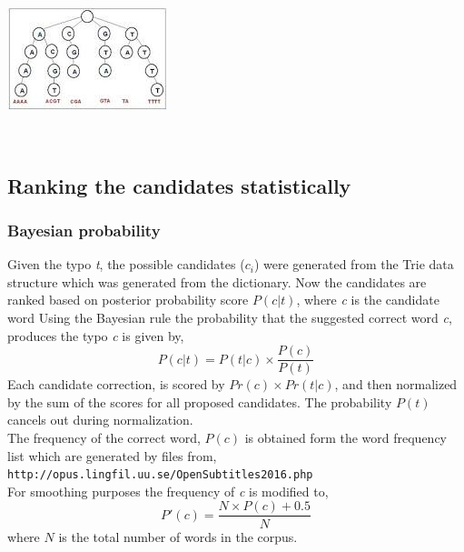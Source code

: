 \documentclass{article}
\begin{document}
				\begin{minipage}{\linewidth}
					\begin{center}
 						\includegraphics[width=\linewidth]{trie}
	  					\label{fig:trie_fig}
					\end{center}
				\end{minipage}\\				
				
		\subsection{Ranking the candidates statistically}
			\subsubsection{Bayesian probability}
				Given the typo \textit{t}, the possible candidates ($c_{i}$) were generated from the Trie data structure which was generated from the dictionary. Now the candidates are ranked based on posterior probability score $P(c|t)$, where \textit{c} is the candidate word
Using the Bayesian rule the probability that the suggested correct word \textit{c}, produces the typo \textit{c} is given by,
				\begin{equation*}
					P(c|t) = P(t|c) \times \frac{P(c)}{P(t)}
				\end{equation*}
				Each candidate correction, is scored by $Pr(c) \times Pr(t|c)$, and then normalized by the sum of the scores for all proposed candidates. The probability $P(t)$ cancels out during normalization.\\
				The frequency of the correct word, $P(c)$ is obtained form the word frequency list which are generated by files from,\\ 
				\texttt{http://opus.lingfil.uu.se/OpenSubtitles2016.php}\\
				For smoothing purposes the frequency of \textit{c} is modified to,
				\begin{equation*}
					P'(c) = \frac{N \times P(c) + 0.5}{N}
				\end{equation*}
				where $N$ is the total number of words in the corpus.
\end{document}
